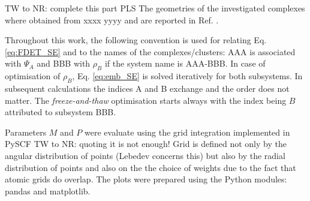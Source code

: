 \documentclass[journal=jctcce,manuscript=article]{achemso}
\begin{document}
{\color{red}TW to NR: complete this part PLS 
The geometries of the investigated complexes where obtained from xxxx yyyy and are reported in Ref. .}

Throughout this work, the following convention is used for relating Eq. \ref{eq:FDET_SE} and to the names of the complexes/clusters: AAA is associated with $\Psi_A$ and BBB with $\rho_B$ if the system name is AAA-BBB.
In case of optimisation of $\rho_B$, Eq. \ref{eq:emb_SE} is solved 
iteratively for both subsystems. In subsequent  calculations the indices A and B exchange and the order does not matter.
The \textit{freeze-and-thaw} optimisation starts always with the index being $B$ attributed to subsystem BBB. 
 
Parameters $M$ and $P$ were evaluate using the grid integration implemented in PySCF\cite{PYSCF} 
{\color{red} TW to NR:  quoting \cite{Lebedev1999} it is not enough! Grid is defined not only by the angular distribution of points  (Lebedev concerns this) but also by the radial distribution of points and also on the the choice of weights due to the fact that atomic grids do overlap.}
The plots were prepared using the Python modules: pandas\cite{PANDAS} and matplotlib\cite{Hunter2007}.
\end{document}
